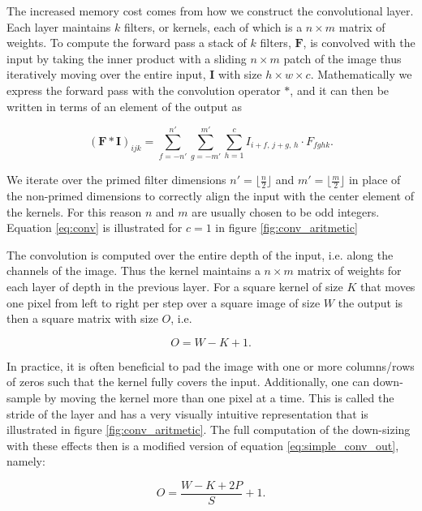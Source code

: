 The increased memory cost comes from how we construct the convolutional layer. Each layer maintains $k$ filters, or kernels, each of which is a $n\times m$ matrix of weights. To compute the forward pass a stack of $k$ filters, $\mathbf{F}$, is convolved with the input by taking the inner product with a sliding $n\times m$ patch of the image thus iteratively moving over the entire input, $\mathbf{I}$ with size $h \times w \times c$. Mathematically we express the forward pass with the convolution operator $*$, and it can then be written in terms of an element of the output as

\begin{equation}\label{eq:conv}
(\mathbf{F}*\mathbf{I})_{ijk} = 
\sum_{f=-n'}^{n'}\sum_{g=-m'}^{m'}\sum_{h=1} ^c
I_{i+f,\, j+g,\, h}\cdot F_{fghk}.
\end{equation}

\noindent We iterate over the primed filter dimensions $n'=\lfloor\frac{n}{2} \rfloor$ and $m' = \lfloor \frac{m}{2} \rfloor$ in place of the non-primed dimensions to correctly align the input with the center element of the kernels. For this reason $n$ and $m$ are usually chosen to be odd integers. Equation \ref{eq:conv} is illustrated for $c=1$ in figure \ref{fig:conv_aritmetic}   

The convolution is computed over the entire depth of the input, i.e. along the channels of the image. Thus the kernel maintains a $n\times m$ matrix of weights for each layer of depth in the previous layer. For a square kernel of size $K$ that moves one pixel from left to right per step over a square image of size $W$ the output is then a square matrix with size $O$, i.e.

\begin{equation}\label{eq:simple_conv_out}
O = W - K +1.
\end{equation}

\noindent In practice, it is often beneficial to pad the image with one or more columns/rows of zeros such that the kernel fully covers the input. Additionally, one can down-sample by moving the kernel more than one pixel at a time. This is called the stride of the layer and has a very visually intuitive representation that is illustrated in figure \ref{fig:conv_aritmetic}. The full computation of the down-sizing with these effects then is a modified version of equation \ref{eq:simple_conv_out}, namely: 

\begin{equation}\label{eq:conv_out}
O = \frac{W - K + 2P}{S} + 1.
\end{equation} 

